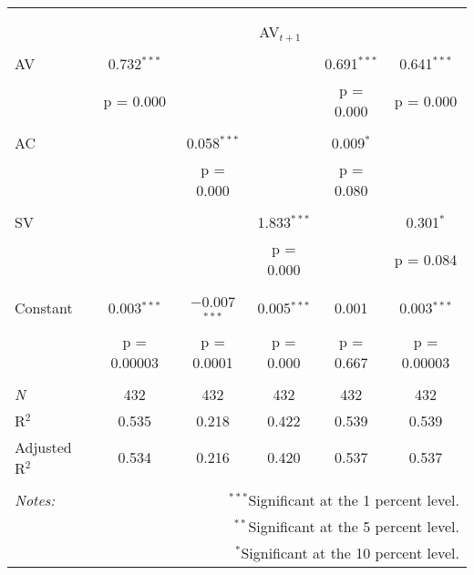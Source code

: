 
\begin{tabular}{@{\extracolsep{5pt}}lccccc} 
\\[-1.8ex]\hline 
\hline \\[-1.8ex] 
\\[-1.8ex] & \multicolumn{5}{c}{AV$_{t+1}$} \\ 
\hline \\[-1.8ex] 
 AV & 0.732$^{***}$ &  &  & 0.691$^{***}$ & 0.641$^{***}$ \\ 
  & p = 0.000 &  &  & p = 0.000 & p = 0.000 \\ 
  & & & & & \\ 
 AC &  & 0.058$^{***}$ &  & 0.009$^{*}$ &  \\ 
  &  & p = 0.000 &  & p = 0.080 &  \\ 
  & & & & & \\ 
 SV &  &  & 1.833$^{***}$ &  & 0.301$^{*}$ \\ 
  &  &  & p = 0.000 &  & p = 0.084 \\ 
  & & & & & \\ 
 Constant & 0.003$^{***}$ & $-$0.007$^{***}$ & 0.005$^{***}$ & 0.001 & 0.003$^{***}$ \\ 
  & p = 0.00003 & p = 0.0001 & p = 0.000 & p = 0.667 & p = 0.00003 \\ 
  & & & & & \\ 
\textit{N} & 432 & 432 & 432 & 432 & 432 \\ 
R$^{2}$ & 0.535 & 0.218 & 0.422 & 0.539 & 0.539 \\ 
Adjusted R$^{2}$ & 0.534 & 0.216 & 0.420 & 0.537 & 0.537 \\ 
\hline 
\hline \\[-1.8ex] 
\textit{Notes:} & \multicolumn{5}{r}{$^{***}$Significant at the 1 percent level.} \\ 
 & \multicolumn{5}{r}{$^{**}$Significant at the 5 percent level.} \\ 
 & \multicolumn{5}{r}{$^{*}$Significant at the 10 percent level.} \\ 
\end{tabular} 
